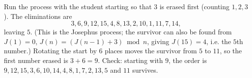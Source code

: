 Run the process with the student starting so that $3$ is erased first (counting $1,2,3$). The eliminations are
\[3,6,9,12,15,4,8,13,2,10,1,11,7,14,\]
leaving $5$. (This is the Josephus process; the survivor can also be found from $J(1)=0$, $J(n)=(J(n-1)+3)\bmod n$, giving $J(15)=4$, i.e. the $5$th number.) Rotating the start by $6$ places moves the survivor from $5$ to $11$, so the first number erased is $3+6=\boxed{9}$. Check: starting with $9$, the order is $9,12,15,3,6,10,14,4,8,1,7,2,13,5$ and $11$ survives.

